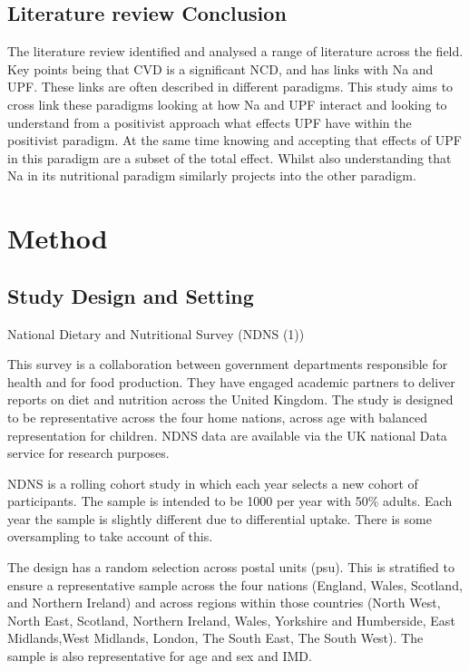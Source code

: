 \documentclass[
]{article}
\begin{document}
\hypertarget{literature-review-conclusion}{%
\subsection{Literature review
Conclusion}\label{literature-review-conclusion}}

The literature review identified and analysed a range of literature
across the field. Key points being that CVD is a significant NCD, and
has links with Na and UPF. These links are often described in different
paradigms. This study aims to cross link these paradigms looking at how
Na and UPF interact and looking to understand from a positivist approach
what effects UPF have within the positivist paradigm. At the same time
knowing and accepting that effects of UPF in this paradigm are a subset
of the total effect. Whilst also understanding that Na in its
nutritional paradigm similarly projects into the other paradigm.

\newpage

\hypertarget{method}{%
\section{Method}\label{method}}

\hypertarget{study-design-and-setting}{%
\subsection{Study Design and Setting}\label{study-design-and-setting}}

National Dietary and Nutritional Survey (NDNS (1))

This survey is a collaboration between government departments
responsible for health and for food production. They have engaged
academic partners to deliver reports on diet and nutrition across the
United Kingdom. The study is designed to be representative across the
four home nations, across age with balanced representation for children.
NDNS data are available via the UK national Data service for research
purposes.

NDNS is a rolling cohort study in which each year selects a new cohort
of participants. The sample is intended to be 1000 per year with 50\%
adults. Each year the sample is slightly different due to differential
uptake. There is some oversampling to take account of this.

The design has a random selection across postal units (psu). This is
stratified to ensure a representative sample across the four nations
(England, Wales, Scotland, and Northern Ireland) and across regions
within those countries (North West, North East, Scotland, Northern
Ireland, Wales, Yorkshire and Humberside, East Midlands,West Midlands,
London, The South East, The South West). The sample is also
representative for age and sex and IMD.
\end{document}

